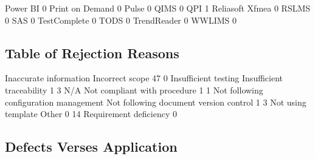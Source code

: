 \documentclass{article}
\begin{document}
\begin{Schunk}
\begin{Soutput}
  Power BI                                               0
  Print on Demand                                        0
  Pulse                                                  0
  QIMS                                                   0
  QPI                                                    1
  Reliasoft Xfmea                                        0
  RSLMS                                                  0
  SAS                                                    0
  TestComplete                                           0
  TODS                                                   0
  TrendReader                                            0
  WWLIMS                                                 0
\end{Soutput}
\end{Schunk}

\subsection{Table of Rejection Reasons}
\begin{Schunk}
\begin{Soutput}
                Inaccurate information                        Incorrect scope 
                                    47                                      0 
                  Insufficient testing              Insufficient traceability 
                                     1                                      3 
                                   N/A           Not compliant with procedure 
                                     1                                      1 
Not following configuration management Not following document version control 
                                     1                                      3 
                    Not using template                                  Other 
                                     0                                     14 
                Requirement deficiency 
                                     0 
\end{Soutput}
\end{Schunk}

\subsection{Defects Verses Application}
\end{document}
